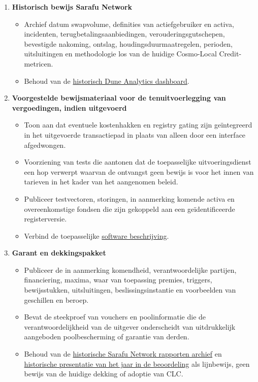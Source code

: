 \documentclass[11pt]{article}
\begin{document}
\begin{enumerate}[leftmargin=*]
\item \textbf{Historisch bewijs Sarafu Network}
\begin{itemize}[leftmargin=*]
\item Archief datum swapvolume, definities van actiefgebruiker en activa, incidenten, terugbetalingsaanbiedingen, verouderingsgutschepen, bevestigde nakoming, ontslag, houdingsduurmaatregelen, perioden, uitsluitingen en methodologie los van de huidige Cosmo-Local Credit-metricen.
\item Behoud van de \href{https://dune.com/grassrootseconomics/sarafu-network}{historisch Dune Analytics dashboard}.
\end{itemize}
\item \textbf{Voorgestelde bewijsmateriaal voor de tenuitvoerlegging van vergoedingen, indien uitgevoerd}
\begin{itemize}[leftmargin=*]
\item Toon aan dat eventuele kostenhakken en registry gating zijn geïntegreerd in het uitgevoerde transactiepad in plaats van alleen door een interface afgedwongen.
\item Voorziening van tests die aantonen dat de toepasselijke uitvoeringsdienst een hop verwerpt waarvan de ontvangst geen bewijs is voor het innen van tarieven in het kader van het aangenomen beleid.
\item Publiceer testvectoren, storingen, in aanmerking komende activa en overeenkomstige fondsen die zijn gekoppeld aan een geïdentificeerde registerversie.
\item Verbind de toepasselijke \href{https://software.grassecon.org}{software beschrijving}.
\end{itemize}
\item \textbf{Garant en dekkingspakket}
\begin{itemize}[leftmargin=*]
\item Publiceer de in aanmerking komendheid, verantwoordelijke partijen, financiering, maxima, waar van toepassing premies, triggers, bewijsstukken, uitsluitingen, beslissingsinstantie en voorbeelden van geschillen en beroep.
\item Bevat de steekproef van vouchers en poolinformatie die de verantwoordelijkheid van de uitgever onderscheidt van uitdrukkelijk aangeboden poolbescherming of garantie van derden.
\item Behoud van de \href{https://sarafu.network/reports}{historische Sarafu Network rapporten archief} en \href{https://youtu.be/5yGaP31bvs0?si=fZ-AMTEXsmVR8Ulv}{historische presentatie van het jaar in de beoordeling} als lijnbewijs, geen bewijs van de huidige dekking of adoptie van CLC.

\end{itemize}
\end{enumerate}
\end{document}
